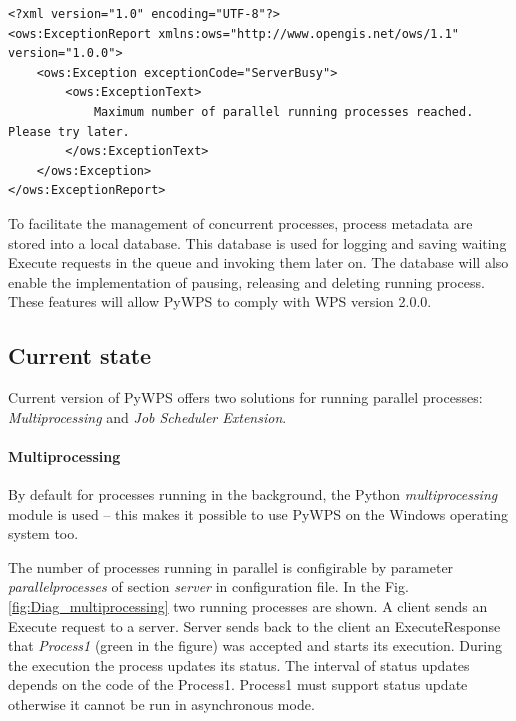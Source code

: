 \documentclass{gifce}
\begin{document}
\begin{lstlisting}[basicstyle=\small,caption={Resource exceeded exception},label={lst:Isolation_rejected}]
<?xml version="1.0" encoding="UTF-8"?>
<ows:ExceptionReport xmlns:ows="http://www.opengis.net/ows/1.1" version="1.0.0">
    <ows:Exception exceptionCode="ServerBusy">
        <ows:ExceptionText>
            Maximum number of parallel running processes reached. Please try later.
        </ows:ExceptionText>
    </ows:Exception>
</ows:ExceptionReport>
\end{lstlisting}

To facilitate the management of concurrent processes, process metadata
are stored into a local database. This database is used for logging
and saving waiting Execute requests in the queue and invoking them
later on. The database will also enable the implementation of
pausing, releasing and deleting running process. These features will
allow PyWPS to comply with WPS version 2.0.0.

\subsection{Current state}
Current version of PyWPS offers two solutions for running parallel processes: \textit{Multiprocessing}
and \textit{Job Scheduler Extension}.

\paragraph{Multiprocessing}
By default for  processes running in the background, the Python \textit{multiprocessing} module is used – 
this makes it possible to use PyWPS on the Windows operating system too.

The number of processes running in parallel is configirable by parameter \textit{parallelprocesses} of section \textit{server} in 
configuration file. In the Fig. \ref{fig:Diag_multiprocessing} two running processes are shown. A client sends an Execute request to
a server. Server sends back to the client an ExecuteResponse that \textit{Process1} (green in the figure) was accepted and starts its 
execution. During the execution the process updates its status. The interval of status updates depends on the code of the Process1.
Process1 must support status update otherwise it cannot be run in asynchronous mode.
\end{document}

